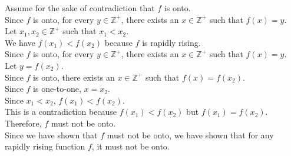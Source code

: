 \documentclass[12pt]{exam}
\begin{document}
\begin{solution}
	Assume for the sake of contradiction that $f$ is onto.\\
	Since $f$ is onto, for every $y\in\mathbb{Z}^+$, there exists an $x\in\mathbb{Z}^+$ such that $f(x) = y$.\\
	Let $x_1, x_2 \in \mathbb{Z}^+$ such that $x_1 < x_2$.\\
	We have $f(x_1) < f(x_2)$ because $f$ is rapidly rising.\\
	Since $f$ is onto, for every $y\in\mathbb{Z}^+$, there exists an $x\in\mathbb{Z}^+$ such that $f(x) = y$.\\
	Let $y = f(x_2)$.\\
	Since $f$ is onto, there exists an $x\in\mathbb{Z}^+$ such that $f(x) = f(x_2)$.\\
	Since $f$ is one-to-one, $x = x_2$.\\
	Since $x_1 < x_2$, $f(x_1) < f(x_2)$.\\
	This is a contradiction because $f(x_1) < f(x_2)$ but $f(x_1) = f(x_2)$.\\
	Therefore, $f$ must not be onto.\\
	Since we have shown that $f$ must not be onto, we have shown that for any rapidly rising function $f$, it must not be onto.
\end{solution}
\end{document}
